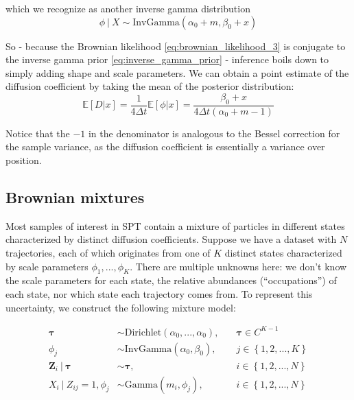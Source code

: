 \documentclass{article}
\let\vec\boldsymbol
\begin{document}
which we recognize as another inverse gamma distribution
\[
    \phi \ | \ X \sim \text{InvGamma} \left( \alpha_{0} + m, \beta_{0} + x \right)
\]

So - because the Brownian likelihood \ref{eq:brownian_likelihood_3} is conjugate to the inverse gamma prior \ref{eq:inverse_gamma_prior} -
inference boils down to simply adding
shape and scale parameters. We can obtain a point estimate of the
diffusion coefficient by taking the mean of the posterior distribution:
\[
    \mathbb{E} \left[ D | x \right] = \frac{1}{4 \Delta t} \mathbb{E} \left[ \phi | x \right] = \frac{\beta_{0} + x}{4 \Delta t \left( \alpha_{0} + m - 1 \right)}
\]

Notice that the $-1$ in the denominator is analogous to the Bessel
correction for the sample variance, as the diffusion coefficient is essentially a variance over position.

\subsection{Brownian mixtures}

Most samples of interest in SPT contain a mixture of particles in different
states characterized by distinct diffusion coefficients. Suppose we have a dataset
with $N$ trajectories, each of which originates from one of $K$ distinct states
characterized by scale parameters $\phi_{1}, ..., \phi_{K}$. There are multiple
unknowns here: we don't know the scale parameters for each state, the relative
abundances (``occupations'') of each state, nor which state each trajectory comes
from. To represent this uncertainty, we construct the following mixture model:

\begin{align}\label{eq:brownian_mixture}
    \boldsymbol{\tau} &\sim \text{Dirichlet} \left( \alpha_{0}, ..., \alpha_{0} \right), &\quad \boldsymbol{\tau} \in C^{K-1} \\
    \phi_{j} &\sim \text{InvGamma} \left( \alpha_{0}, \beta_{0} \right), &\quad j \in \left\{ 1, 2, ..., K \right\} \\
    \vec{Z}_{i} \ | \ \boldsymbol{\tau} &\sim \boldsymbol{\tau}, &\quad i \in \left\{ 1, 2, ..., N \right\} \\
    X_{i} \ | \ Z_{ij} = 1, \phi_{j} &\sim \text{Gamma} \left( m_{i}, \phi_{j} \right), &\quad i \in \left\{ 1, 2, ..., N \right\} \label{eq:brownian_mixture_last}
\end{align}
\end{document}
